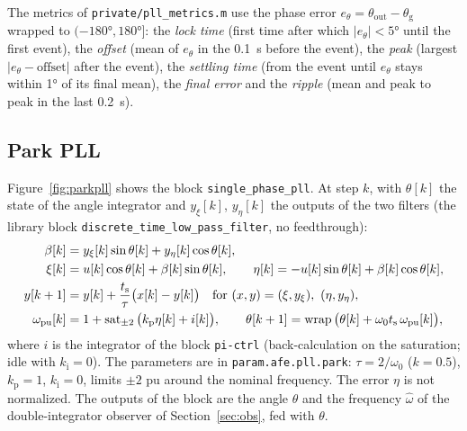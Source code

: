 \documentclass[11pt,a4paper]{scrartcl}
\newcommand{\ped}[1]{_{\mathrm{#1}}}
\newcommand{\code}[1]{\texttt{#1}}
\newcommand{\sat}{\operatorname{sat}}
\newcommand{\wrapop}{\operatorname{wrap}}
\begin{document}
\begin{onehalfspace}
The metrics of \code{private/pll\_metrics.m} use the phase error $e_\theta = \theta\ped{out} - \theta\ped{g}$ wrapped to $(-\ang{180}, \ang{180}]$: the \emph{lock time} (first time after which $|e_\theta| < \ang{5}$ until the first event), the \emph{offset} (mean of $e_\theta$ in the \SI{0.1}{\second} before the event), the \emph{peak} (largest $|e_\theta - \text{offset}|$ after the event), the \emph{settling time} (from the event until $e_\theta$ stays within \ang{1} of its final mean), the \emph{final error} and the \emph{ripple} (mean and peak to peak in the last \SI{0.2}{\second}).

\subsection{Park PLL}
\label{sec:parkpll}

Figure~\ref{fig:parkpll} shows the block \code{single\_phase\_pll}. At step $k$, with $\theta[k]$ the state of the angle integrator and $y_\xi[k]$, $y_\eta[k]$ the outputs of the two filters (the library block \code{discrete\_time\_low\_pass\_filter}, no feedthrough):
\begin{align}
	\beta[k] &= y_\xi[k]\sin\theta[k] + y_\eta[k]\cos\theta[k], \notag \\
	\xi[k] &= u[k]\cos\theta[k] + \beta[k]\sin\theta[k], \qquad \eta[k] = -u[k]\sin\theta[k] + \beta[k]\cos\theta[k], \notag \\
	y[k+1] &= y[k] + \frac{t\ped{s}}{\tau}\big(x[k] - y[k]\big) \quad \text{for } (x, y) = (\xi, y_\xi),\ (\eta, y_\eta), \label{eq:parkblock} \\
	\omega\ped{pu}[k] &= 1 + \sat_{\pm 2}\big(k\ped{p}\eta[k] + i[k]\big), \qquad \theta[k+1] = \wrapop\big(\theta[k] + \omega_0 t\ped{s}\, \omega\ped{pu}[k]\big), \notag
\end{align}
where $i$ is the integrator of the block \code{pi-ctrl} (back-calculation on the saturation; idle with $k\ped{i} = 0$). The parameters are in \code{param.afe.pll.park}: $\tau = 2/\omega_0$ ($k = 0.5$), $k\ped{p} = 1$, $k\ped{i} = 0$, limits $\pm 2$ pu around the nominal frequency. The error $\eta$ is not normalized. The outputs of the block are the angle $\hat\theta$ and the frequency $\hat\omega$ of the double-integrator observer of Section~\ref{sec:obs}, fed with $\theta$.


\end{onehalfspace}
\end{document}
